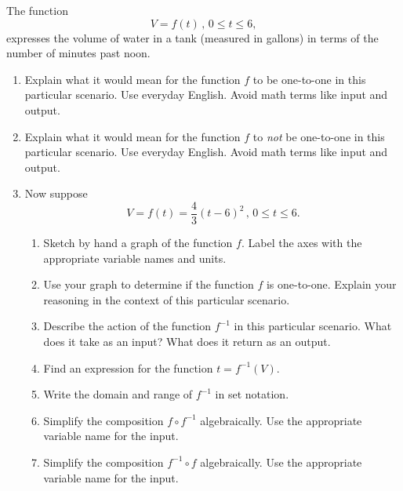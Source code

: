 \documentclass{ximera}
\begin{document}
\begin{question} \label{Qpve03}
The function
\[
      V = f(t) \, , \, 0\leq t \leq 6,
\]
expresses the volume of water in a tank (measured in gallons) in terms of the number of minutes past noon.
 

\begin{enumerate}
\item Explain what it would mean for the function $f$ to be one-to-one in this particular scenario. Use everyday English. Avoid math terms like input and output.

\item Explain what it would mean for the function $f$ to \emph{not} be one-to-one in this particular scenario. Use everyday English. Avoid math terms like input and output.  

\item Now suppose 
\[
  V = f(t) = \frac{4}{3}\left( t-6 \right)^2 \, , \, 0\leq t \leq 6.
\]


\begin{enumerate}
\item Sketch by hand a graph of the function $f$. Label the axes with the appropriate variable names and units. 

\item Use your graph to determine if the function $f$ is one-to-one. Explain your reasoning in the context of this particular scenario.

\item Describe the action of the function $f^{-1}$ in this particular scenario. What does it take as an input? What does it return as an output.

\item Find an expression for the function $t = f^{-1}(V)$. 

\item Write the domain and range of $f^{-1}$ in set notation.

\item Simplify the composition $f\circ f^{-1}$ algebraically. Use the appropriate variable name for the input.

\item Simplify the composition $f^{-1}\circ f$ algebraically. Use the appropriate variable name for the input.

\end{enumerate}
\end{enumerate}
\end{question}
\end{document}
